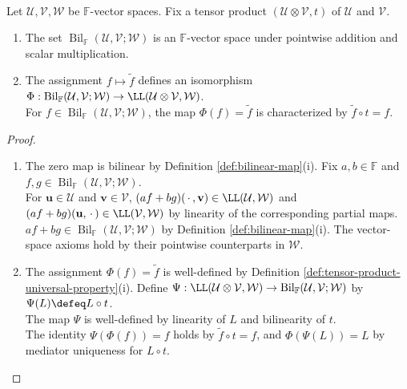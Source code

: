 \begin{theorem} \label{thm:tensor-linearizes-bilinear-maps} \\
Let $\mathcal{U},\mathcal{V},\mathcal{W}$ be $\mathbb{F}$-vector spaces. Fix a tensor product $(\mathcal{U}\otimes\mathcal{V},t)$ of $\mathcal{U}$ and $\mathcal{V}$.
\begin{enumerate}[label=(\roman*)]
\setlength{\itemsep}{0pt}
\item The set $\operatorname{Bil}_{\mathbb{F}}(\mathcal{U},\mathcal{V};\mathcal{W})$ is an $\mathbb{F}$-vector space under pointwise addition and scalar multiplication.
\item The assignment $f\mapsto\widetilde{f}$ defines an isomorphism $\Phi:\operatorname{Bil}_{\mathbb{F}}(\mathcal{U},\mathcal{V};\mathcal{W})\to\LL(\mathcal{U}\otimes\mathcal{V},\mathcal{W})$.\\
For $f\in\operatorname{Bil}_{\mathbb{F}}(\mathcal{U},\mathcal{V};\mathcal{W})$, the map $\Phi(f)=\widetilde{f}$ is characterized by $\widetilde{f}\circ t=f$.
\end{enumerate}
\begin{proof}
\begin{enumerate}[label=(\roman*)]
\setlength{\itemsep}{0pt}
\item The zero map is bilinear by Definition \ref{def:bilinear-map}(i). Fix $a,b\in\mathbb{F}$ and $f,g\in\operatorname{Bil}_{\mathbb{F}}(\mathcal{U},\mathcal{V};\mathcal{W})$.\\
For $\mathbf{u}\in\mathcal{U}$ and $\mathbf{v}\in\mathcal{V}$, $(af+bg)(\,\cdot\,,\mathbf{v})\in\LL(\mathcal{U},\mathcal{W})$ and $(af+bg)(\mathbf{u},\,\cdot\,)\in\LL(\mathcal{V},\mathcal{W})$ by linearity of the corresponding partial maps.\\
$af+bg\in\operatorname{Bil}_{\mathbb{F}}(\mathcal{U},\mathcal{V};\mathcal{W})$ by Definition \ref{def:bilinear-map}(i). The vector-space axioms hold by their pointwise counterparts in $\mathcal{W}$.
\item The assignment $\Phi(f)=\widetilde{f}$ is well-defined by Definition \ref{def:tensor-product-universal-property}(i). Define $\Psi:\LL(\mathcal{U}\otimes\mathcal{V},\mathcal{W})\to\operatorname{Bil}_{\mathbb{F}}(\mathcal{U},\mathcal{V};\mathcal{W})$ by $\Psi(L)\defeq L\circ t$.\\
The map $\Psi$ is well-defined by linearity of $L$ and bilinearity of $t$.\\
The identity $\Psi(\Phi(f))=f$ holds by $\widetilde{f}\circ t=f$, and $\Phi(\Psi(L))=L$ by mediator uniqueness for $L\circ t$.\\

\end{enumerate}
\end{proof}
\end{theorem}
